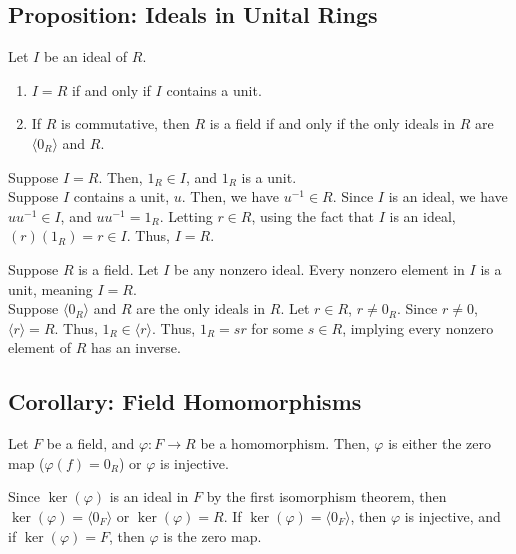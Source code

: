 \documentclass[10pt]{extarticle}
\begin{document}
  \subsection{Proposition: Ideals in Unital Rings}%
  Let $I$ be an ideal of $R$.
  \begin{enumerate}[(1)]
    \item $I = R$ if and only if $I$ contains a unit.
    \item If $R$ is commutative, then $R$ is a field if and only if the only ideals in $R$ are $\langle 0_R\rangle$ and $R$.
  \end{enumerate}
  \begin{description}[font=\normalfont]
    \item[Proof of (1):] Suppose $I = R$. Then, $1_R \in I$, and $1_R$ is a unit.\\

      Suppose $I$ contains a unit, $u$. Then, we have $u^{-1}\in R$. Since $I$ is an ideal, we have $uu^{-1} \in I$, and $uu^{-1} = 1_R$. Letting $r\in R$, using the fact that $I$ is an ideal, $(r)(1_R) = r\in I$. Thus, $I = R$.
    \item[Proof of (2):] Suppose $R$ is a field. Let $I$ be any nonzero ideal. Every nonzero element in $I$ is a unit, meaning $I = R$.\\

      Suppose $\langle 0_R\rangle$ and $R$ are the only ideals in $R$. Let $r \in R$, $r\neq 0_R$. Since $r\neq 0$, $\langle r \rangle = R$. Thus, $1_R \in \langle r \rangle$. Thus, $1_R = sr$ for some $s\in R$, implying every nonzero element of $R$ has an inverse.
  \end{description}
  \subsection{Corollary: Field Homomorphisms}%
  Let $F$ be a field, and $\varphi: F\rightarrow R$ be a homomorphism. Then, $\varphi$ is either the zero map ($\varphi(f) = 0_R$) or $\varphi$ is injective.
  \begin{description}[font=\normalfont]
    \item[Proof:] Since $\ker(\varphi)$ is an ideal in $F$ by the first isomorphism theorem, then $\ker(\varphi) = \langle 0_F\rangle$ or $\ker(\varphi) = R$. If $\ker(\varphi) = \langle 0_F\rangle$, then $\varphi$ is injective, and if $\ker(\varphi) = F$, then $\varphi$ is the zero map.
  \end{description}
\end{document}
